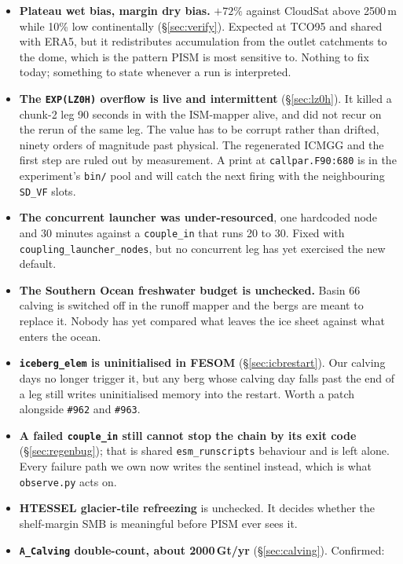\documentclass[11pt,a4paper]{article}
\newcommand{\code}[1]{\texttt{\small #1}}
\begin{document}
\begin{itemize}
\item \textbf{Plateau wet bias, margin dry bias.} $+72\%$ against CloudSat above 2500\,m while
      10\% low continentally (\S\ref{sec:verify}). Expected at TCO95 and shared with ERA5, but it
      redistributes accumulation from the outlet catchments to the dome, which is the pattern PISM
      is most sensitive to. Nothing to fix today; something to state whenever a run is interpreted.
\item \textbf{The \code{EXP(LZ0H)} overflow is live and intermittent} (\S\ref{sec:lz0h}). It
      killed a chunk-2 leg 90 seconds in with the ISM-mapper alive, and did not recur on the rerun
      of the same leg. The value has to be corrupt rather than drifted, ninety orders of magnitude
      past physical. The regenerated ICMGG and the first step are ruled out by measurement. A print
      at \code{callpar.F90:680} is in the experiment's \code{bin/} pool and will catch the next
      firing with the neighbouring \code{SD\_VF} slots.
\item \textbf{The concurrent launcher was under-resourced}, one hardcoded node and 30 minutes
      against a \code{couple\_in} that runs 20 to 30. Fixed with
      \code{coupling\_launcher\_nodes}, but no concurrent leg has yet exercised the new default.
\item \textbf{The Southern Ocean freshwater budget is unchecked.} Basin 66 calving is switched off
      in the runoff mapper and the bergs are meant to replace it. Nobody has yet compared what
      leaves the ice sheet against what enters the ocean.
\item \textbf{\code{iceberg\_elem} is uninitialised in FESOM} (\S\ref{sec:icbrestart}). Our
      calving days no longer trigger it, but any berg whose calving day falls past the end of a leg
      still writes uninitialised memory into the restart. Worth a patch alongside \code{\#962} and
      \code{\#963}.
\item \textbf{A failed \code{couple\_in} still cannot stop the chain by its exit code}
      (\S\ref{sec:regenbug}); that is shared \code{esm\_runscripts} behaviour and is left alone.
      Every failure path we own now writes the sentinel instead, which is what \code{observe.py}
      acts on.
\item \textbf{HTESSEL glacier-tile refreezing} is unchecked. It decides whether the shelf-margin
      SMB is meaningful before PISM ever sees it.
\item \textbf{\code{A\_Calving} double-count, about 2000\,Gt/yr} (\S\ref{sec:calving}). Confirmed:

\end{itemize}
\end{document}
